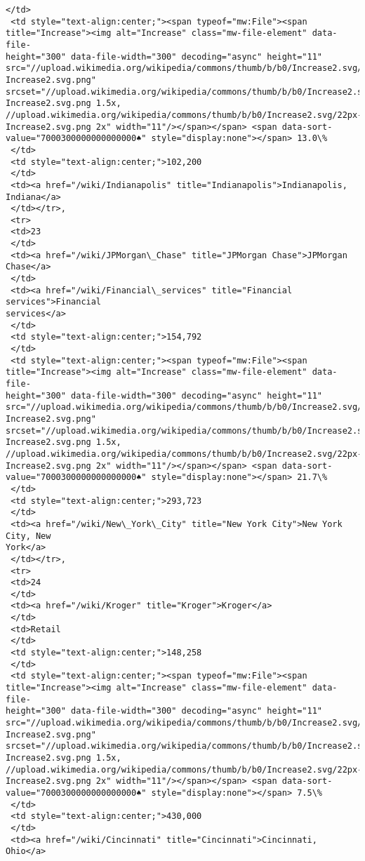 \documentclass[11pt]{article}
\begin{document}
\begin{tcolorbox}[breakable, size=fbox, boxrule=.5pt, pad at break*=1mm, opacityfill=0]
\begin{Verbatim}[commandchars=\\\{\}]
 </td>
 <td style="text-align:center;"><span typeof="mw:File"><span
title="Increase"><img alt="Increase" class="mw-file-element" data-file-
height="300" data-file-width="300" decoding="async" height="11"
src="//upload.wikimedia.org/wikipedia/commons/thumb/b/b0/Increase2.svg/11px-
Increase2.svg.png"
srcset="//upload.wikimedia.org/wikipedia/commons/thumb/b/b0/Increase2.svg/17px-
Increase2.svg.png 1.5x,
//upload.wikimedia.org/wikipedia/commons/thumb/b/b0/Increase2.svg/22px-
Increase2.svg.png 2x" width="11"/></span></span> <span data-sort-
value="7000300000000000000♠" style="display:none"></span> 13.0\%
 </td>
 <td style="text-align:center;">102,200
 </td>
 <td><a href="/wiki/Indianapolis" title="Indianapolis">Indianapolis, Indiana</a>
 </td></tr>,
 <tr>
 <td>23
 </td>
 <td><a href="/wiki/JPMorgan\_Chase" title="JPMorgan Chase">JPMorgan Chase</a>
 </td>
 <td><a href="/wiki/Financial\_services" title="Financial services">Financial
services</a>
 </td>
 <td style="text-align:center;">154,792
 </td>
 <td style="text-align:center;"><span typeof="mw:File"><span
title="Increase"><img alt="Increase" class="mw-file-element" data-file-
height="300" data-file-width="300" decoding="async" height="11"
src="//upload.wikimedia.org/wikipedia/commons/thumb/b/b0/Increase2.svg/11px-
Increase2.svg.png"
srcset="//upload.wikimedia.org/wikipedia/commons/thumb/b/b0/Increase2.svg/17px-
Increase2.svg.png 1.5x,
//upload.wikimedia.org/wikipedia/commons/thumb/b/b0/Increase2.svg/22px-
Increase2.svg.png 2x" width="11"/></span></span> <span data-sort-
value="7000300000000000000♠" style="display:none"></span> 21.7\%
 </td>
 <td style="text-align:center;">293,723
 </td>
 <td><a href="/wiki/New\_York\_City" title="New York City">New York City, New
York</a>
 </td></tr>,
 <tr>
 <td>24
 </td>
 <td><a href="/wiki/Kroger" title="Kroger">Kroger</a>
 </td>
 <td>Retail
 </td>
 <td style="text-align:center;">148,258
 </td>
 <td style="text-align:center;"><span typeof="mw:File"><span
title="Increase"><img alt="Increase" class="mw-file-element" data-file-
height="300" data-file-width="300" decoding="async" height="11"
src="//upload.wikimedia.org/wikipedia/commons/thumb/b/b0/Increase2.svg/11px-
Increase2.svg.png"
srcset="//upload.wikimedia.org/wikipedia/commons/thumb/b/b0/Increase2.svg/17px-
Increase2.svg.png 1.5x,
//upload.wikimedia.org/wikipedia/commons/thumb/b/b0/Increase2.svg/22px-
Increase2.svg.png 2x" width="11"/></span></span> <span data-sort-
value="7000300000000000000♠" style="display:none"></span> 7.5\%
 </td>
 <td style="text-align:center;">430,000
 </td>
 <td><a href="/wiki/Cincinnati" title="Cincinnati">Cincinnati, Ohio</a>

\end{Verbatim}
\end{tcolorbox}
\end{document}
